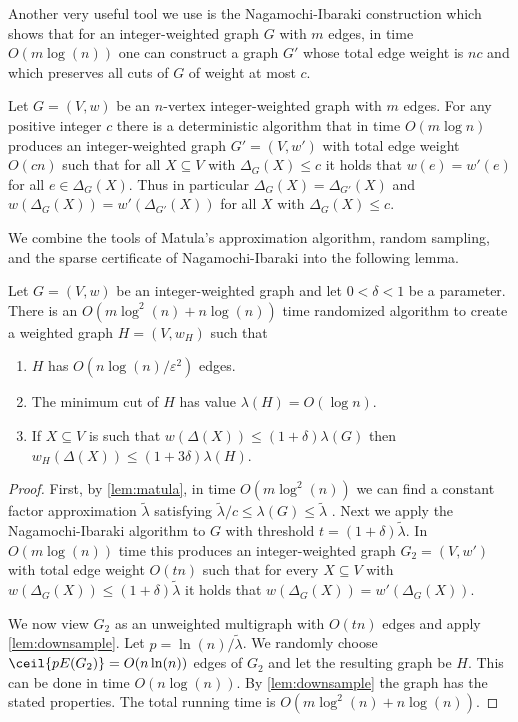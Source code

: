 Another very useful tool we use is the Nagamochi-Ibaraki construction which shows that for an integer-weighted graph $G$ with $m$ edges, in time $O(m \log(n))$ one can construct 
a graph $G'$ whose total edge weight is $nc$ and which preserves all cuts of $G$ of weight at most $c$.  

\begin{lemma}[\cite{NI92}]
Let $G =(V,w)$ be an $n$-vertex integer-weighted graph with $m$ edges.  For any positive integer $c$ there is a deterministic algorithm that in time $O(m \log n)$ produces an integer-weighted graph $G' = (V,w')$ with 
total edge weight $O(cn)$ such that for all $X \subseteq V$ with $\Delta_G(X) \le c$ it holds that $w(e) = w'(e)$ for all $e \in \Delta_G(X)$.  Thus in particular $\Delta_G(X) = \Delta_{G'}(X)$ and $w(\Delta_G(X)) = w'(\Delta_{G'}(X))$ for 
all $X$ with $\Delta_G(X) \le c$.
\end{lemma}

We combine the tools of Matula's approximation algorithm, random sampling, and the sparse certificate of Nagamochi-Ibaraki into the following lemma.
\begin{lemma}
\label{lem:Hprop}
Let $G = (V,w)$ be an integer-weighted graph and let $0 < \delta < 1$ be a parameter.  There is an $O(m \log^2(n) + n\log(n))$ time randomized algorithm to create a weighted graph $H = (V, w_H)$ such that 
\begin{enumerate}
  \item $H$ has $O(n \log(n)/\varepsilon^2)$ edges.
  \item The minimum cut of $H$ has value $\lambda(H) = O(\log n)$.
  \item If $X \subseteq V$ is such that $w(\Delta(X)) \le (1+\delta) \lambda(G)$ then $w_H(\Delta(X)) \le (1+3\delta) \lambda(H)$.
\end{enumerate}
\end{lemma}

\begin{proof}
First, by \cref{lem:matula}, in time $O(m \log^2(n))$ we can find a constant factor approximation $\tilde \lambda$ satisfying $\tilde \lambda/c \le \lambda(G) \le \tilde \lambda$ .  Next we apply the Nagamochi-Ibaraki 
algorithm to $G$ with threshold $t = (1+\delta)\tilde \lambda$.  In $O(m \log(n))$ time this produces an integer-weighted graph $G_2 = (V,w')$ with total edge weight $O(tn)$ such that for every $X \subseteq V$ with 
$w(\Delta_G(X)) \le (1+\delta) \tilde \lambda$ it holds that $w(\Delta_G(X)) = w'(\Delta_G(X))$.  

We now view $G_2$ as an unweighted multigraph with $O(tn)$ edges and apply \cref{lem:downsample}.
Let $p = \ln(n)/\tilde \lambda$.  We randomly choose $\ceil{p E(G_2)} =  O(n \ln(n))$ edges of $G_2$ and let the resulting graph be $H$.  This can be done in time $O(n \log(n))$.  
By \cref{lem:downsample} the graph has the stated properties.  The total running time is $O(m\log^2(n)+ n \log(n))$.
\end{proof}

